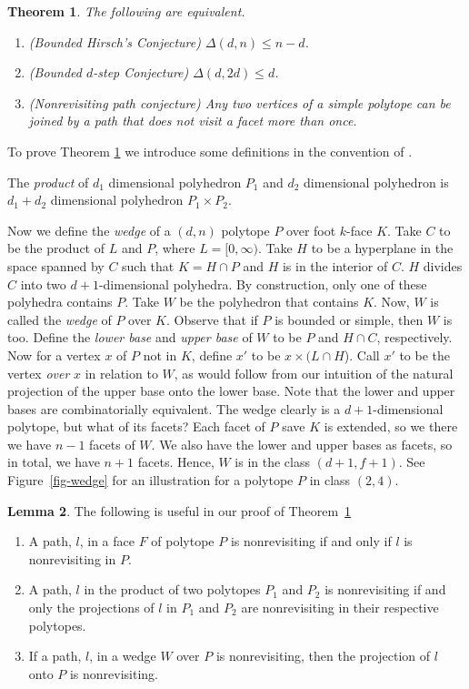 \documentclass[11pt,a4paper]{article}
\newtheorem{thm}{Theorem}[section]
\theoremstyle{definition}
\newtheorem{lem}[thm]{Lemma}
\begin{document}
\begin{thm}\label{thm-hirschequiv}
	The following are equivalent.
	\begin{enumerate}
		\item (Bounded Hirsch's Conjecture) $\Delta(d,n)\le n-d$.
		\item (Bounded $d$-step Conjecture) $\Delta(d,2d)\le d$.
		\item (Nonrevisiting path conjecture) Any two vertices of a simple polytope can be joined by a path that does not visit a facet more than once.
	\end{enumerate}
\end{thm}
To prove Theorem \ref{thm-hirschequiv} we introduce some definitions in the convention of \citet{klee67}.

The \emph{product} of $d_1$ dimensional polyhedron $P_1$ and $d_2$ dimensional polyhedron is $d_1+d_2$ dimensional polyhedron $P_1\times P_2$.

Now we define the \emph{wedge} of a $(d,n)$ polytope $P$ over foot $k$-face $K$. Take $C$ to be the product of $L$ and $P$, where $L=[0,\infty)$. Take $H$ to be a hyperplane in the space spanned by $C$ such that $K=H\cap P$ and $H$ is in the interior of $C$. $H$ divides $C$ into two $d+1$-dimensional polyhedra. By construction, only one of these polyhedra contains $P$. Take $W$ be the polyhedron that contains $K$. Now, $W$ is called the \emph{wedge} of $P$ over $K$. Observe that if $P$ is bounded or simple, then $W$ is too. Define the \emph{lower base} and \emph{upper base} of $W$ to be $P$ and $H\cap C$, respectively. Now for a vertex $x$ of $P$ not in $K$, define $x'$ to be $x\times (L \cap H$). Call $x'$ to be the vertex \emph{over} $x$ in relation to $W$, as would follow from our intuition of the natural projection of the upper base onto the lower base. Note that the lower and upper bases are combinatorially equivalent. The wedge clearly is a $d+1$-dimensional polytope, but what of its facets? Each facet of $P$ save $K$ is extended, so we there we have $n-1$ facets of $W$. We also have the lower and upper bases as facets, so in total, we have $n+1$ facets. Hence, $W$ is in the class $(d+1,f+1)$. See Figure~\ref{fig-wedge} for an illustration for a polytope $P$ in class $(2,4)$.

\begin{lem} The following is useful in our proof of Theorem~\ref{thm-hirschequiv}
\begin{enumerate}
\item A path, $l$, in a face $F$ of polytope $P$ is nonrevisiting if and only if $l$ is nonrevisiting in $P$.
\item A path, $l$ in the product of two polytopes $P_1$ and $P_2$ is nonrevisiting if and only the projections of $l$ in $P_1$ and $P_2$ are nonrevisiting in their respective polytopes.
\item If a path, $l$, in a wedge $W$ over $P$ is nonrevisiting, then the projection of $l$ onto $P$ is nonrevisiting. \citep{klee67}
\end{enumerate}
\end{lem}
\end{document}
